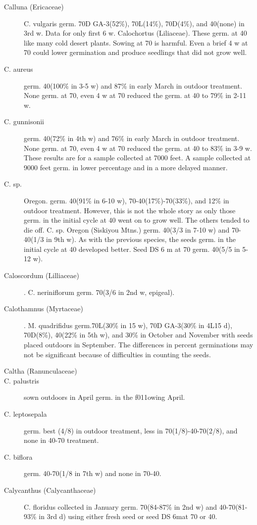 \begin{description}
\item[Calluna (Ericaceae)] C. vulgaris germ. 70D GA-3(52\%), 70L(14\%),
70D(4\%), and 40(none) in 3rd w. Data for only first 6 w.
Calochortus (Liliaceae). These germ. at 40 like many cold desert plants.
Sowing at 70 is harmful. Even a brief 4 w at 70 could lower germination and produce
seedlings that did not grow well.
\item[C. aureus] germ. 40(100\% in 3-5 w) and 87\% in early March in outdoor
treatment. None germ. at 70, even 4 w at 70 reduced the germ. at 40 to 79\% in 2-11 w.
\item[C. gunnisonii] germ. 40(72\% in 4th w) and 76\% in early March in outdoor
treatment. None germ. at 70, even 4 w at 70 reduced the germ. at 40 to 83\% in 3-9 w.
These results are for a sample collected at 7000 feet. A sample collected at 9000 feet
germ. in lower percentage and in a more delayed manner.
\item[C. sp.] Oregon. germ. 40(91\% in 6-10 w), 70-40(17\%)-70(33\%), and 12\% in
outdoor treatment. However, this is not the whole story as only those germ. in the
initial cycle at 40 went on to grow well. The others tended to die off.
C. sp. Oregon (Siskiyou Mtns.) germ. 40(3/3 in 7-10 w) and 70-40(1/3 in 9th w).
As with the previous species, the seeds germ. in the initial cycle at 40 developed
better. Seed DS 6 m at 70 germ. 40(5/5 in 5-12 w).
\item[Caloscordum (Lilliaceae)]. C. neriniflorum germ. 70(3/6 in 2nd w, epigeal).
\item[Calothamnus (Myrtaceae)]. M. quadrifidus germ.70L(30\% in 15 w), 70D
GA-3(30\% in 4L15 d), 70D(8\%), 40(22\% in 5th w), and 30\% in October and November
with seeds placed outdoors in September. The differences in percent germinations
may not be significant because of difficulties in counting the seeds.

\item[Caltha (Ranunculaceae)]
\item[C. palustris] sown outdoors in April germ. in the f011owing April.
\item[C. leptosepala] germ. best (4/8) in outdoor treatment, less in 70(1/8)-40-70(2/8),
and none in 40-70 treatment.
\item[C. biflora] germ. 40-70(1/8 in 7th w) and none in 70-40.
\item[Calycanthus (Calycanthaceae)] C. floridus collected in January germ.
70(84-87\% in 2nd w) and 40-70(81-93\% in 3rd d) using either fresh seed or seed DS
6mat 70 or 40.


\end{description}
